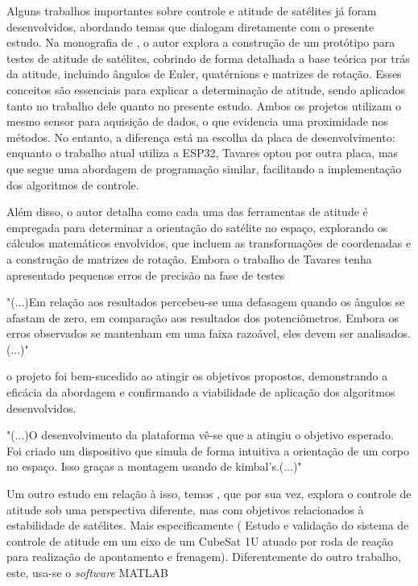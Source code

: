 \documentclass[
	12pt,				%
	openright,			%
	oneside,			%
	a4paper,			%
	english,			%
	brazil				%
	]{abntex2}
\begin{document}
Alguns trabalhos importantes sobre controle e atitude de satélites já foram desenvolvidos, abordando temas que dialogam diretamente com o presente estudo. Na monografia de \cite{tavares2017}, o autor explora a construção de um protótipo para testes de atitude de satélites, cobrindo de forma detalhada a base teórica por trás da atitude, incluindo ângulos de Euler, quatérnions e matrizes de rotação. Esses conceitos são essenciais para explicar a determinação de atitude, sendo aplicados tanto no trabalho dele quanto no presente estudo. Ambos os projetos utilizam o mesmo sensor para aquisição de dados, o que evidencia uma proximidade nos métodos. No entanto, a diferença está na escolha da placa de desenvolvimento: enquanto o trabalho atual utiliza a ESP32, Tavares optou por outra placa, mas que segue uma abordagem de programação similar, facilitando a implementação dos algoritmos de controle.

Além disso, o autor detalha como cada uma das ferramentas de atitude é empregada para determinar a orientação do satélite no espaço, explorando os cálculos matemáticos envolvidos, que incluem as transformações de coordenadas e a construção de matrizes de rotação. Embora o trabalho de Tavares tenha apresentado pequenos erros de precisão na fase de testes

\begin{citacao}
	"(...)Em relação aos resultados percebeu-se uma defasagem quando os
	ângulos se afastam de zero, em comparação aos resultados dos potenciômetros. Embora
	os erros observados se mantenham em uma faixa razoável, eles devem ser analisados.(...)"
\end{citacao}

 o projeto foi bem-sucedido ao atingir os objetivos propostos, demonstrando a eficácia da abordagem e confirmando a viabilidade de aplicação dos algoritmos desenvolvidos.
 
\begin{citacao}
	"(...)O desenvolvimento da plataforma vê-se que a atingiu o objetivo esperado. Foi
	criado um dispositivo que simula de forma intuitiva a orientação de um corpo no espaço.
	Isso graças a montagem usando de kimbal’s.(...)"
\end{citacao}


Um outro estudo em relação à isso, temos \cite{faustino2019}, que por sua vez, explora o controle de atitude sob uma perspectiva diferente, mas com objetivos relacionados à estabilidade de satélites. Mais especificamente ( Estudo e validação do sistema de controle de atitude em um eixo de um CubeSat 1U atuado por roda de reação para realização de apontamento e frenagem). Diferentemente do outro trabalho, este, usa-se o \textit{software} MATLAB 
\end{document}
